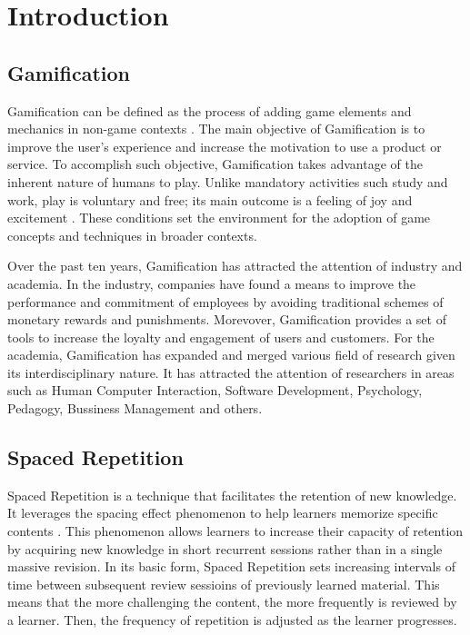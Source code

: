 
\chapter{Introduction} %

\label{intro} %


\section{Gamification}
Gamification can be defined as the process of adding game elements and mechanics in non-game contexts \citep{deterding2011game}. The main objective of Gamification is to improve the user's experience and increase the motivation to use a product or service. To accomplish such objective, Gamification takes advantage of the inherent nature of humans to play. Unlike mandatory activities such study and work, play is voluntary and free; its main outcome is a feeling of joy and excitement \citep{johan1950homo}. These conditions set the environment for the adoption of game concepts and techniques in broader contexts.

Over the past ten years, Gamification has attracted the attention of industry and academia. In the industry, companies have found a means to improve the performance and commitment of employees by avoiding traditional schemes of monetary rewards and punishments. Morevover, Gamification provides a set of tools to increase the loyalty and engagement of users and customers. For the academia, Gamification has expanded and merged various field of research given its interdisciplinary nature. It has attracted the attention of researchers in areas such as Human Computer Interaction, Software Development, Psychology, Pedagogy, Bussiness Management and others.

\section{Spaced Repetition}
Spaced Repetition is a technique that facilitates the retention of new knowledge. It leverages the spacing effect phenomenon to help learners memorize specific contents \citep{hintzman1974theoretical}. This phenomenon allows learners to increase their capacity of retention by acquiring new knowledge in short recurrent sessions rather than in a single massive revision. In its basic form, Spaced Repetition sets increasing intervals of time between subsequent review sessioins of previously learned material. This means that the more challenging the content, the more frequently is reviewed by a learner. Then, the frequency of repetition is adjusted as the learner progresses.

